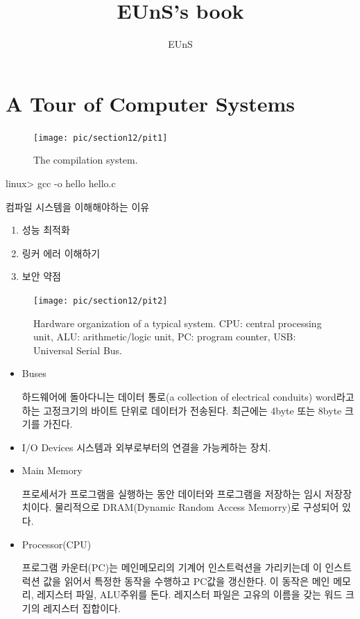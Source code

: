 \documentclass[chapter,oneside]{oblivoir}
\begin{document}
    
    \title{EUnS's book}
    \author{ EUnS }

    \maketitle

    \tableofcontents



\chapter{A Tour of Computer Systems}


\begin{figure}[h!]
    \centering
    \texttt{[image: pic/section12/pit1]}
    \caption{The compilation system.}
\end{figure}

linux> gcc -o hello hello.c

컴파일 시스템을 이해해야하는 이유

\begin{enumerate}
    \item 성능 최적화
    \item 링커 에러 이해하기
    \item 보안 약점
\end{enumerate}


\begin{figure}[h!]
    \centering
    \texttt{[image: pic/section12/pit2]}
    \caption{Hardware organization
    of a typical system. CPU:
    central processing unit,
    ALU: arithmetic/logic unit,
    PC: program counter, USB:
    Universal Serial Bus.}
\end{figure}


\begin{itemize}
    \item Buses
    
    하드웨어에 돌아다니는 데이터 통로(a collection of electrical conduits) word라고 하는 고정크기의 바이트 단위로 데이터가 전송된다. 최근에는 4byte 또는 8byte 크기를 가진다.

    \item I/O Devices
    시스템과 외부로부터의 연결을 가능케하는 장치.

    \item Main Memory
    
    프로세서가 프로그램을 실행하는 동안 데이터와 프로그램을 저장하는 임시 저장장치이다. 물리적으로 DRAM(Dynamic Random Access Memorry)로 구성되어 있다.

    \item Processor(CPU)
    
    프로그램 카운터(PC)는 메인메모리의 기계어 인스트럭션을 가리키는데 이 인스트럭션 값을 읽어서 특정한 동작을 수행하고 PC값을 갱신한다. 이 동작은 메인 메모리, 레지스터 파일, ALU주위를 돈다.
    레지스터 파일은 고유의 이름을 갖는 워드 크기의 레지스터 집합이다.
\end{itemize}
\end{document}

